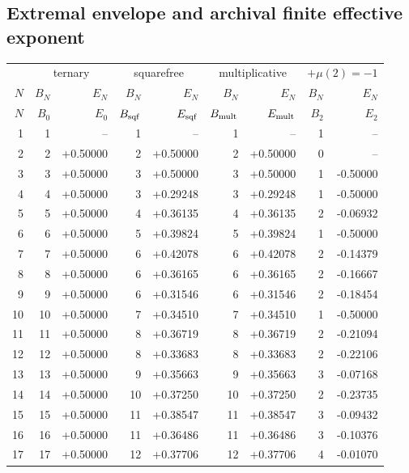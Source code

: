 \documentclass[11pt]{article}
\begin{document}
\subsection{Extremal envelope and archival finite effective exponent}
\begin{center}\scriptsize\begin{longtable}{r rr rr rr rr}
\toprule & \multicolumn{2}{c}{ternary} & \multicolumn{2}{c}{squarefree} & \multicolumn{2}{c}{multiplicative} & \multicolumn{2}{c}{$+\mu(2)=-1$}\\
$N$ & $B_N$ & $E_N$ & $B_N$ & $E_N$ & $B_N$ & $E_N$ & $B_N$ & $E_N$\\ \midrule\endfirsthead
\toprule $N$ & $B_0$ & $E_0$ & $B_{\rm sqf}$ & $E_{\rm sqf}$ & $B_{\rm mult}$ & $E_{\rm mult}$ & $B_2$ & $E_2$\\ \midrule\endhead
1 & 1 & -- & 1 & -- & 1 & -- & 1 & --\\
2 & 2 & +0.50000 & 2 & +0.50000 & 2 & +0.50000 & 0 & --\\
3 & 3 & +0.50000 & 3 & +0.50000 & 3 & +0.50000 & 1 & -0.50000\\
4 & 4 & +0.50000 & 3 & +0.29248 & 3 & +0.29248 & 1 & -0.50000\\
5 & 5 & +0.50000 & 4 & +0.36135 & 4 & +0.36135 & 2 & -0.06932\\
6 & 6 & +0.50000 & 5 & +0.39824 & 5 & +0.39824 & 1 & -0.50000\\
7 & 7 & +0.50000 & 6 & +0.42078 & 6 & +0.42078 & 2 & -0.14379\\
8 & 8 & +0.50000 & 6 & +0.36165 & 6 & +0.36165 & 2 & -0.16667\\
9 & 9 & +0.50000 & 6 & +0.31546 & 6 & +0.31546 & 2 & -0.18454\\
10 & 10 & +0.50000 & 7 & +0.34510 & 7 & +0.34510 & 1 & -0.50000\\
11 & 11 & +0.50000 & 8 & +0.36719 & 8 & +0.36719 & 2 & -0.21094\\
12 & 12 & +0.50000 & 8 & +0.33683 & 8 & +0.33683 & 2 & -0.22106\\
13 & 13 & +0.50000 & 9 & +0.35663 & 9 & +0.35663 & 3 & -0.07168\\
14 & 14 & +0.50000 & 10 & +0.37250 & 10 & +0.37250 & 2 & -0.23735\\
15 & 15 & +0.50000 & 11 & +0.38547 & 11 & +0.38547 & 3 & -0.09432\\
16 & 16 & +0.50000 & 11 & +0.36486 & 11 & +0.36486 & 3 & -0.10376\\
17 & 17 & +0.50000 & 12 & +0.37706 & 12 & +0.37706 & 4 & -0.01070\\

\end{longtable}
\end{center}
\end{document}
